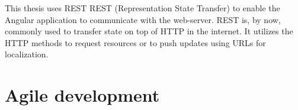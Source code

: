 This thesis uses REST REST (Representation State Transfer) to enable the Angular application to communicate with the web-server.
REST is, by now, commonly used to transfer state on top of HTTP in the internet.
It utilizes the HTTP methods\cite{http:methods} to request resources or to push updates using URLs for localization.


\section{Agile development}
\label{fundamental:agile}

